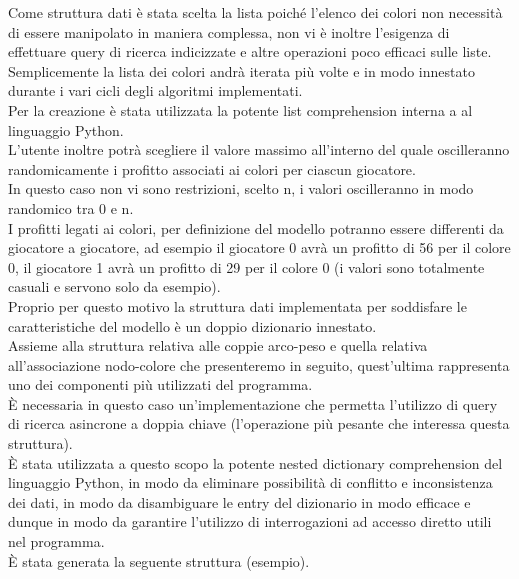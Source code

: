 Come struttura dati è stata scelta la lista poiché l'elenco dei colori non necessità di essere manipolato in maniera complessa, non vi è inoltre l'esigenza di effettuare query di ricerca indicizzate e altre operazioni poco efficaci sulle liste.\\
Semplicemente la lista dei colori andrà iterata più volte e in modo innestato durante i vari cicli degli algoritmi implementati.\\
Per la creazione è stata utilizzata la potente list comprehension interna a al linguaggio Python.\\

L'utente inoltre potrà scegliere il valore massimo all'interno del quale oscilleranno randomicamente i profitto associati ai colori per ciascun giocatore.\\
In questo caso non vi sono restrizioni, scelto n, i valori oscilleranno in modo randomico tra 0 e n.\\
I profitti legati ai colori, per definizione del modello potranno essere differenti da giocatore a giocatore, ad esempio il giocatore 0 avrà un profitto di 56 per il colore 0, il giocatore 1 avrà un profitto di 29 per il colore 0 (i valori sono totalmente casuali e servono solo da esempio).\\

Proprio per questo motivo la struttura dati implementata per soddisfare le caratteristiche del modello è un doppio dizionario innestato.\\
Assieme alla struttura relativa alle coppie arco-peso e quella relativa all'associazione nodo-colore che presenteremo in seguito, quest'ultima rappresenta uno dei componenti più utilizzati del programma.\\
È necessaria in questo caso un'implementazione che permetta l'utilizzo di query di ricerca asincrone a doppia chiave (l'operazione più pesante che interessa questa struttura).\\
È stata utilizzata a questo scopo la potente nested dictionary comprehension del linguaggio Python, in modo da eliminare possibilità di conflitto e inconsistenza dei dati, in modo da disambiguare le entry del dizionario in modo efficace e dunque in modo da garantire l'utilizzo di interrogazioni ad accesso diretto utili nel programma.\\
È stata generata la seguente struttura (esempio).

